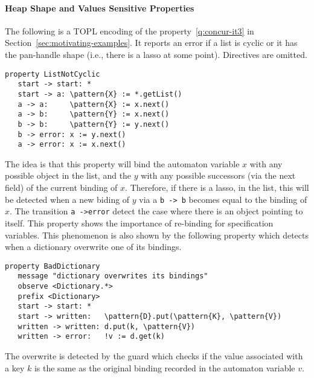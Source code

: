 \documentclass[9pt, preprint]{sigplanconf} %
\newcommand{\delimitVerbatim}{\par\nobreak\smallskip\noindent}
\newcommand{\pattern}[1]{\ensuremath{\mathtt{\underline{#1}}}}
\theoremstyle{definition}
\theoremstyle{remark}
\begin{document}
\paragraph{Heap Shape and Values Sensitive Properties}  %
The following is a TOPL encoding of the property~\eqref{q:concur-it3} in Section~\ref{sec:motivating-examples}.
It reports an error if a list is cyclic or it has the pan-handle shape (i.e.,
there is a lasso at some point). Directives are omitted.
%
\delimitVerbatim
\begin{Verbatim}[commandchars=\\\{\}]
 property ListNotCyclic
   start -> start: *
   start -> a: \pattern{X} := *.getList()
   a -> a:     \pattern{X} := x.next()
   a -> b:     \pattern{Y} := x.next()
   b -> b:     \pattern{Y} := y.next()
   b -> error: x := y.next()
   a -> error: x := x.next()
\end{Verbatim}
\delimitVerbatim
The idea is that this property will bind the automaton variable $x$ with any possible object in the list, and the $y$ with any possible successors (via the next field) of the current binding of $x$.
Therefore, if there is a lasso, in the list, this will be detected when a new biding of $y$ via a \texttt{b -> b} becomes equal to the binding of $x$.
The transition \texttt{a ->error} detect the case where there is an object pointing to itself. This property shows the importance of re-binding for specification variables. This phenomenon is also shown by  the following property which detects when a dictionary overwrite one of its bindings.
\delimitVerbatim
\begin{Verbatim}[commandchars=\\\{\}]
 property BadDictionary
   message "dictionary overwrites its bindings"
   observe <Dictionary.*>
   prefix <Dictionary>
   start -> start: *
   start -> written:   \pattern{D}.put(\pattern{K}, \pattern{V})
   written -> written: d.put(k, \pattern{V})
   written -> error:   !v := d.get(k)
\end{Verbatim}
\delimitVerbatim
The overwrite is detected by the guard which checks if the value associated with a key $k$ is the same as the original binding recorded in the automaton variable $v$.
\end{document}
